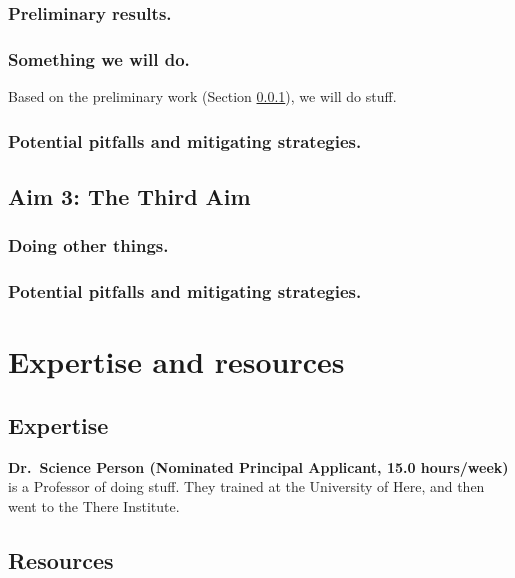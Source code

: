 \documentclass[12pt]{article}
\begin{document}
\subsubsection {Preliminary results.}\label{sec:prelim}



\lipsum[40-42]


\subsubsection {Something we will do.}

Based on the preliminary work (Section \ref{sec:prelim}), we will do stuff.
\lipsum[51-53]

\subsubsection {Potential pitfalls and mitigating strategies.}

\lipsum[30]


\subsection {Aim 3: The Third Aim}

\subsubsection {Doing other things.}

\lipsum[7-11]

\subsubsection {Potential pitfalls and mitigating strategies.}

\lipsum[20]



\section {Expertise and resources}

\subsection {Expertise}\label{sec:team}

\textbf{Dr.~Science Person (Nominated Principal Applicant, 15.0 hours/week)} is a Professor of doing stuff.
They trained at the University of Here, and then went to the There Institute.
\lipsum[22]

\subsection {Resources}

\lipsum[27-28]



\newpage
\AtBeginShipout{%
\AtBeginShipoutDiscard
}



\end{document}
